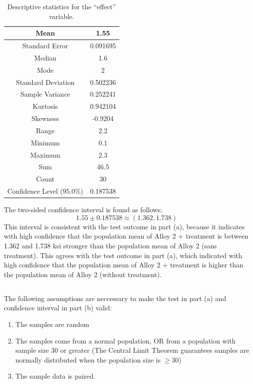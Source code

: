 \documentclass[letterpaper]{article}
\begin{document}
\begin{table}[H]
 \centering
 \begin{tabular}{|c|c|}
  \hline
  Mean                      & 1.55     \\ \hline
  Standard Error            & 0.091695 \\ \hline
  Median                    & 1.6      \\ \hline
  Mode                      & 2        \\ \hline
  Standard Deviation        & 0.502236 \\ \hline
  Sample Variance           & 0.252241 \\ \hline
  Kurtosis                  & 0.942104 \\ \hline
  Skewness                  & -0.9204  \\ \hline
  Range                     & 2.2      \\ \hline
  Minimum                   & 0.1      \\ \hline
  Maximum                   & 2.3      \\ \hline
  Sum                       & 46.5     \\ \hline
  Count                     & 30       \\ \hline
  Confidence Level (95.0\%) & 0.187538 \\ \hline
 \end{tabular}
 \caption{Descriptive statistics for the ``effect'' variable.}
 \label{my-label}
\end{table}

The two-sided confidence interval is found as follows:
$$1.55 \pm 0.187538 \approx (1.362, 1.738) $$
This interval is consistent with the test outcome in
part (a), because it indicates with high confidence that the population mean of
Alloy 2 + treatment is between 1.362 and 1.738 ksi stronger than the population
mean of Alloy 2 (sans treatment). This agrees with the test outcome in part (a),
which indicated with high confidence that the population mean of Alloy 2 +
treatment is higher than the population mean of Alloy 2 (without treatment).

\subsection{}%

The following assumptions are neccessary to make the test in part (a)
and confidence interval in part (b) valid:
\begin{enumerate}
 \item The samples are random
 \item The samples come from a normal population,
       OR from a population with sample size 30 or greater
       (The Central Limit Theorem guarantees samples are normally distributed
       when the population size is $\geq 30$)
 \item The sample data is paired.
\end{enumerate}
\end{document}

